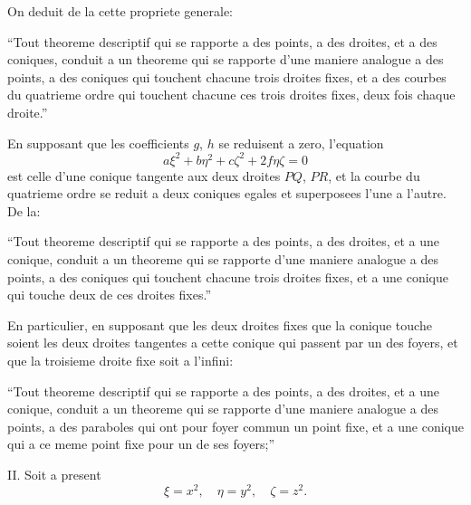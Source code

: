 \documentclass[12pt,a4paper]{article}
\begin{document}
On deduit de la cette propriete generale:

``Tout theoreme descriptif qui se rapporte a des points, a des droites, et a des coniques, conduit a un theoreme qui se rapporte d'une maniere analogue a des points, a des coniques qui touchent chacune trois droites fixes, et a des courbes du quatrieme ordre qui touchent chacune ces trois droites fixes, deux fois chaque droite.''

En supposant que les coefficients $g$, $h$ se reduisent a zero, l'equation
\[
a\xi^2 + b\eta^2 + c\zeta^2 + 2f\eta\zeta = 0
\]
est celle d'une conique tangente aux deux droites $PQ$, $PR$, et la courbe du quatrieme ordre se reduit a deux coniques egales et superposees l'une a l'autre. De la:

``Tout theoreme descriptif qui se rapporte a des points, a des droites, et a une conique, conduit a un theoreme qui se rapporte d'une maniere analogue a des points, a des coniques qui touchent chacune trois droites fixes, et a une conique qui touche deux de ces droites fixes.''

En particulier, en supposant que les deux droites fixes que la conique touche soient les deux droites tangentes a cette conique qui passent par un des foyers, et que la troisieme droite fixe soit a l'infini:

``Tout theoreme descriptif qui se rapporte a des points, a des droites, et a une conique, conduit a un theoreme qui se rapporte d'une maniere analogue a des points, a des paraboles qui ont pour foyer commun un point fixe, et a une conique qui a ce meme point fixe pour un de ses foyers;''

\textsc{II.} Soit a present
\[
\xi = x^2, \quad \eta = y^2, \quad \zeta = z^2.
\]
\end{document}
